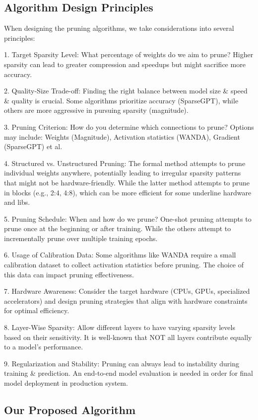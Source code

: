 \documentclass{article} %
\begin{document}
\subsection{Algorithm Design Principles}
When designing the pruning algorithms, we take considerations into several principles:

1. Target Sparsity Level: What percentage of weights do we aim to prune? Higher sparsity can lead to greater compression and speedups but might sacrifice more accuracy.

2. Quality-Size Trade-off: Finding the right balance between model size \& speed \& quality is crucial. Some algorithms prioritize accuracy (SparseGPT), while others are more aggressive in pursuing sparsity (magnitude).

3. Pruning Criterion: How do you determine which connections to prune? Options may include: Weights (Magnitude), Activation statistics (WANDA), Gradient (SparseGPT) et al.

4. Structured vs. Unstructured Pruning: The formal method attempts to prune individual weights anywhere, potentially leading to irregular sparsity patterns that might not be hardware-friendly. While the latter method attempts to prune in blocks (e.g., 2:4, 4:8), which can be more efficient for some underline hardware and libs.

5. Pruning Schedule: When and how do we prune? One-shot pruning attempts to prune once at the beginning or after training. While the others attempt to incrementally prune over multiple training epochs.

6. Usage of Calibration Data: Some algorithms like WANDA require a small calibration dataset to collect activation statistics before pruning. The choice of this data can impact pruning effectiveness.

7. Hardware Awareness: Consider the target hardware (CPUs, GPUs, specialized accelerators) and design pruning strategies that align with hardware constraints for optimal efficiency.

8. Layer-Wise Sparsity: Allow different layers to have varying sparsity levels based on their sensitivity. It is well-known that NOT all layers contribute equally to a model's performance.

9. Regularization and Stability: Pruning can always lead to instability during training \& prediction. An end-to-end model evaluation is needed in order for final model deployment in production system.

\subsection{Our Proposed Algorithm}
\end{document}
